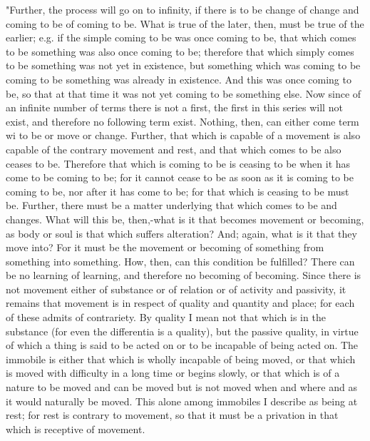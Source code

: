 "Further, the process will go on to infinity, if there is to be change
of change and coming to be of coming to be. What is true of the later,
then, must be true of the earlier; e.g. if the simple coming to be
was once coming to be, that which comes to be something was also once
coming to be; therefore that which simply comes to be something was
not yet in existence, but something which was coming to be coming
to be something was already in existence. And this was once coming
to be, so that at that time it was not yet coming to be something
else. Now since of an infinite number of terms there is not a first,
the first in this series will not exist, and therefore no following
term exist. Nothing, then, can either come term wi to be or move or
change. Further, that which is capable of a movement is also capable
of the contrary movement and rest, and that which comes to be also
ceases to be. Therefore that which is coming to be is ceasing to be
when it has come to be coming to be; for it cannot cease to be as
soon as it is coming to be coming to be, nor after it has come to
be; for that which is ceasing to be must be. Further, there must be
a matter underlying that which comes to be and changes. What will
this be, then,-what is it that becomes movement or becoming, as body
or soul is that which suffers alteration? And; again, what is it that
they move into? For it must be the movement or becoming of something
from something into something. How, then, can this condition be fulfilled?
There can be no learning of learning, and therefore no becoming of
becoming. Since there is not movement either of substance or of relation
or of activity and passivity, it remains that movement is in respect
of quality and quantity and place; for each of these admits of contrariety.
By quality I mean not that which is in the substance (for even the
differentia is a quality), but the passive quality, in virtue of which
a thing is said to be acted on or to be incapable of being acted on.
The immobile is either that which is wholly incapable of being moved,
or that which is moved with difficulty in a long time or begins slowly,
or that which is of a nature to be moved and can be moved but is not
moved when and where and as it would naturally be moved. This alone
among immobiles I describe as being at rest; for rest is contrary
to movement, so that it must be a privation in that which is receptive
of movement. 

